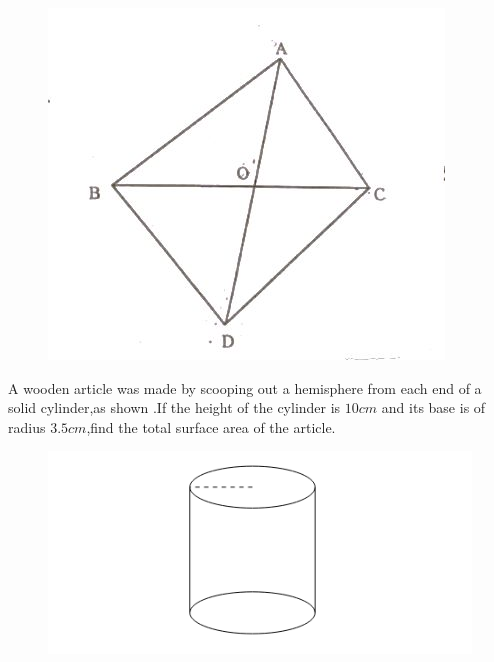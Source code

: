      \begin{figure}[H]
  \centering
  \includegraphics[width=\columnwidth]{figs/square.jpeg}
  \caption{}
  \label{fig:square.jpeg}
\end{figure}
\pagebreak
     \item  A wooden article was made by scooping out a hemisphere from each end of a solid cylinder,as shown .If the height of the cylinder is $10 cm$ and its base is of radius $3.5 cm$,find the total surface area of the article.
      \begin{figure}[H]
  \centering
  \includegraphics[width=\columnwidth]{figs/cylinder.png}
  \caption{}
  \label{fig:cylinder.png}
\end{figure}
%
